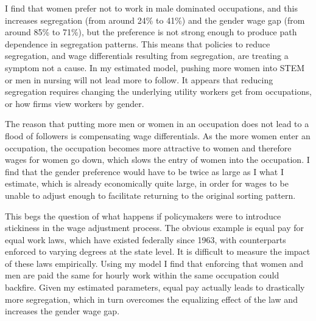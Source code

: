 \documentclass[12pt]{article}
\begin{document}
I find that women prefer not to work in male dominated occupations, and this increases segregation (from around 24\% to 41\%) and the gender wage gap (from around 85\% to 71\%), but the preference is not strong enough to produce path dependence in segregation patterns.  This means that policies to reduce segregation, and wage differentials resulting from segregation, are treating a symptom not a cause. In my estimated model, pushing more women into STEM or men in nursing will not lead more to follow. It appears that reducing segregation requires changing the underlying utility workers get from occupations, or how firms view workers by gender.


The reason that putting more men or women in an occupation does not lead to a flood of followers is compensating wage differentials. As the more women enter an occupation, the occupation becomes more attractive to women and therefore wages for women go down, which slows the entry of women into the occupation. I find that the gender preference would have to be twice as large as I what I estimate, which is already economically quite large, in order for wages to be unable to adjust enough to facilitate returning to the original sorting pattern. 

This begs the question of what happens if policymakers were to introduce stickiness in the wage adjustment process. The obvious example is equal pay for equal work laws, which have existed federally since 1963, with counterparts enforced to varying degrees at the state level. It is difficult to measure the impact of these laws empirically. Using my model I find that enforcing that women and men are paid the same for hourly work within the same occupation could backfire. Given my estimated parameters, equal pay actually leads to drastically more segregation, which in turn overcomes the equalizing effect of the law and increases the gender wage gap. 

\end{document}
